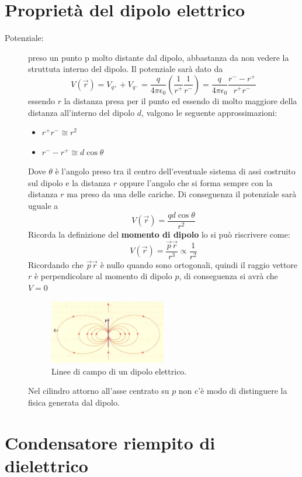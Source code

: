 \documentclass[a4paper, 12pt]{book}
\theoremstyle{plain}
\begin{document}
\section{Proprietà del dipolo elettrico}

\begin{description}
    \item[Potenziale:] preso un punto p molto distante dal dipolo, abbastanza da non vedere la struttuta interno del dipolo. Il potenziale sarà dato da \[ V(\vec{r}) = V_{q^+} + V_{q^-} = \frac{q}{4 \pi \epsilon_0}(\frac{1}{r^+} \frac{1}{r^-}) = \frac{q}{4 \pi \epsilon_0} \frac{r^- - r^+ }{r^+r^-} \] 
    essendo $r$ la distanza presa per il punto ed essendo di molto maggiore della distanza all'interno del dipolo $d$, valgono le 
    seguente approssimazioni: 
    \begin{itemize}
        \item $r^+r^- \cong r^2$
        \item $r^--r^+ \cong d\cos \theta$
    \end{itemize} 
    Dove $\theta$ è l'angolo preso tra il centro dell'eventuale sistema di assi costruito sul dipolo e la distanza $r$ oppure 
    l'angolo che si forma sempre con la distanza $r$ ma preso da una delle cariche. Di conseguenza il potenziale sarà uguale a 
    \[ 
        V(\vec{r}) = \frac{qd\cos \theta}{r^2}
    \]
    Ricorda la definizione del \textbf{momento di dipolo} lo si può riscrivere come:
    \[
        V(\vec{r}) = \frac{\vec{p} \vec{r}}{r^3} \propto \frac{1}{r^2}
    \]
    Ricordando che $\vec{p} \vec{r}$ è nullo quando sono ortogonali, quindi il raggio vettore $r$ è perpendicolare al momento di dipolo
    $p$, di conseguenza si avrà che $V = 0$
    \begin{figure}
        \includegraphics[width=0.5\textwidth]{dipolo.png}
        \caption[]{Linee di campo di un dipolo elettrico.}
    \end{figure}
    Nel cilindro attorno all'asse centrato su $p$ non c'è modo di distinguere la fisica generata dal dipolo.
\end{description}

\section{Condensatore riempito di dielettrico}
\end{document}
